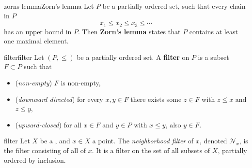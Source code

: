 \begin{topic}{zorns-lemma}{Zorn's lemma}
    Let $P$ be a partially ordered set, such that every chain in $P$
    \[ x_1 \le x_2 \le x_3 \le \cdots \]
    has an upper bound in $P$. Then \textbf{Zorn's lemma} states that $P$ contains at least one maximal element.
\end{topic}

\begin{topic}{filter}{filter}
    Let $(P, \le)$ be a partially ordered set. A \textbf{filter} on $P$ is a subset $F \subset P$ such that
    \begin{itemize}
        \item (\textit{non-empty}) $F$ is non-empty,
        \item (\textit{downward directed}) for every $x, y \in F$ there exists some $z \in F$ with $z \le x$ and $z \le y$,
        \item (\textit{upward-closed}) for all $x \in F$ and $y \in P$ with $x \le y$, also $y \in F$.
    \end{itemize}
\end{topic}

\begin{example}{filter}
    Let $X$ be a , and $x \in X$ a point. The \textit{neighborhood filter} of $x$, denoted $\mathcal{N}_x$, is the filter consisting of all  of $x$. It is a filter on the set of all subsets of $X$, partially ordered by inclusion.
\end{example}
